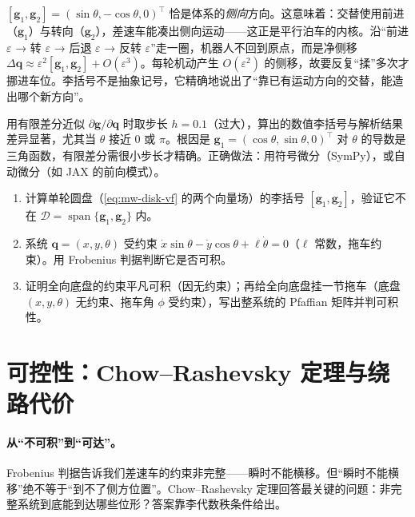 \begin{insight}[平行泊车的数学本质]\label{ins:mw-parking}
$[\mathbf{g}_1,\mathbf{g}_2]=(\sin\theta,-\cos\theta,0)^\top$ 恰是体系的\emph{侧向}方向。这意味着：交替使用前进（$\mathbf{g}_1$）与转向（$\mathbf{g}_2$），差速车能凑出侧向运动——这正是平行泊车的内核。沿“前进 $\varepsilon$ → 转 $\varepsilon$ → 后退 $\varepsilon$ → 反转 $\varepsilon$”走一圈，机器人不回到原点，而是净侧移 $\Delta\mathbf{q}\approx\varepsilon^2[\mathbf{g}_1,\mathbf{g}_2]+O(\varepsilon^3)$。每轮机动产生 $O(\varepsilon^2)$ 的侧移，故要反复“揉”多次才挪进车位。李括号不是抽象记号，它精确地说出了“靠已有运动方向的交替，能造出哪个新方向”。
\end{insight}

\begin{pitfall}
用有限差分近似 $\partial\mathbf{g}/\partial\mathbf{q}$ 时取步长 $h=0.1$（过大），算出的数值李括号与解析结果差异显著，尤其当 $\theta$ 接近 $0$ 或 $\pi$。根因是 $\mathbf{g}_1=(\cos\theta,\sin\theta,0)^\top$ 对 $\theta$ 的导数是三角函数，有限差分需很小步长才精确。正确做法：用符号微分（SymPy），或自动微分（如 JAX 的前向模式）。
\end{pitfall}

\begin{practice}
\begin{enumerate}
  \item 计算单轮圆盘（\cref{eq:mw-disk-vf} 的两个向量场）的李括号 $[\mathbf{g}_1,\mathbf{g}_2]$，验证它不在 $\mathcal{D}=\operatorname{span}\{\mathbf{g}_1,\mathbf{g}_2\}$ 内。
  \item 系统 $\mathbf{q}=(x,y,\theta)$ 受约束 $\dot x\sin\theta-\dot y\cos\theta+\ell\dot\theta=0$（$\ell$ 常数，拖车约束）。用 Frobenius 判据判断它是否可积。
  \item 证明全向底盘的约束平凡可积（因无约束）；再给全向底盘挂一节拖车（底盘 $(x,y,\theta)$ 无约束、拖车角 $\phi$ 受约束），写出整系统的 Pfaffian 矩阵并判可积性。
\end{enumerate}
\end{practice}

\section{可控性：Chow--Rashevsky 定理与绕路代价}
\label{sec:mw-controllability}

\paragraph{从“不可积”到“可达”。}
Frobenius 判据告诉我们差速车的约束非完整——瞬时不能横移。但“瞬时不能横移”绝不等于“到不了侧方位置”。Chow--Rashevsky 定理回答最关键的问题：非完整系统到底能到达哪些位形？答案靠李代数秩条件给出。

